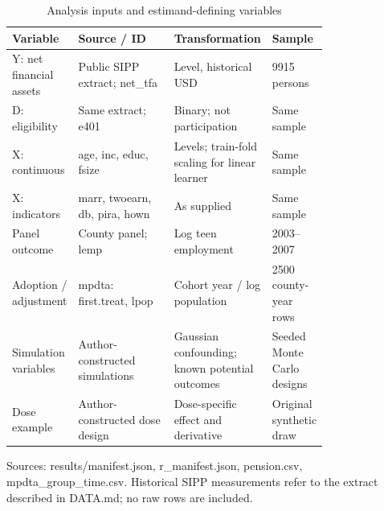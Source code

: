 \begin{table}[htbp]
\centering
\footnotesize
\caption{Analysis inputs and estimand-defining variables}
\begin{tabularx}{\linewidth}{p{0.20\linewidth}p{0.31\linewidth}p{0.27\linewidth}X}
\toprule
Variable & Source / ID & Transformation & Sample \\
\midrule
Y: net financial assets & Public SIPP extract; net\_\allowbreak{}tfa & Level, historical USD & 9915 persons \\
D: eligibility & Same extract; e401 & Binary; not participation & Same sample \\
X: continuous & age, inc, educ, fsize & Levels; train-fold scaling for linear learner & Same sample \\
X: indicators & marr, twoearn, db, pira, hown & As supplied & Same sample \\
Panel outcome & County panel; lemp & Log teen employment & 2003–2007 \\
Adoption / adjustment & mpdta: first.treat, lpop & Cohort year / log population & 2500 county-year rows \\
Simulation variables & Author-constructed simulations & Gaussian confounding; known potential outcomes & Seeded Monte Carlo designs \\
Dose example & Author-constructed dose design & Dose-specific effect and derivative & Original synthetic draw \\
\bottomrule
\end{tabularx}
\par\vspace{3pt}\begin{minipage}{\linewidth}\footnotesize Sources: results/manifest.\allowbreak{}json, r\_\allowbreak{}manifest.\allowbreak{}json, pension.\allowbreak{}csv, mpdta\_\allowbreak{}group\_\allowbreak{}time.\allowbreak{}csv.\allowbreak{} Historical SIPP measurements refer to the extract described in DATA.\allowbreak{}md; no raw rows are included.\allowbreak{}\end{minipage}
\end{table}
